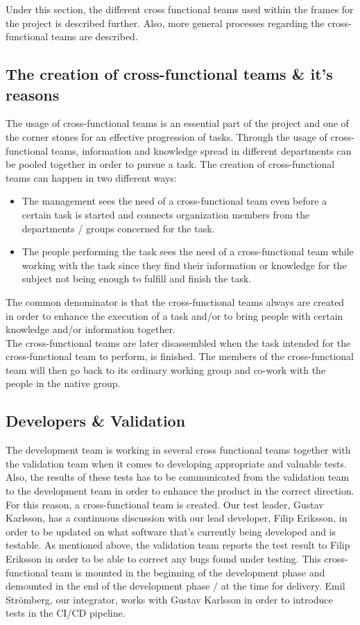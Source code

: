 Under this section, the different cross functional teams used within the frames for the project is described further. Also, more general processes regarding the cross-functional teams are described.
\subsection{The creation of cross-functional teams \& it's reasons}
The usage of cross-functional teams is an essential part of the project and one of the corner stones for an effective progression of tasks. Through the usage of cross-functional teams, information and knowledge spread in different departments can be pooled together in order to pursue a task. The creation of cross-functional teams can happen in two different ways:

\begin{itemize}
    \item The management sees the need of a cross-functional team even before a certain task is started and connects organization members from the departments / groups concerned for the task. 
    \item The people performing the task sees the need of a cross-functional team while working with the task since they find their information or knowledge for the subject not being enough to fulfill and finish the task.
\end{itemize}

The common denominator is that the cross-functional teams always are created in order to enhance the execution of a task and/or to bring people with certain knowledge and/or information together. \\

The cross-functional teams are later disassembled when the task intended for the cross-functional team to perform, is finished. The members of the cross-functional team will then go back to its ordinary working group and co-work with the people in the native group. 

\subsection{Developers \& Validation}
The development team is working in several cross functional teams together with the validation team when it comes to developing appropriate and valuable tests. Also, the results of these tests has to be communicated from the validation team to the development team in order to enhance the product in the correct direction. For this reason, a cross-functional team is created. Our test leader, Gustav Karlsson, has a continuous discussion with our lead developer, Filip Eriksson, in order to be updated on what software that's currently being developed and is testable. As mentioned above, the validation team reports the test result to Filip Eriksson in order to be able to correct any bugs found under testing. This cross-functional team is mounted in the beginning of the development phase and demounted in the end of the development phase / at the time for delivery. Emil Strömberg, our integrator, works with Gustav Karlsson in order to introduce tests in the CI/CD pipeline. 

